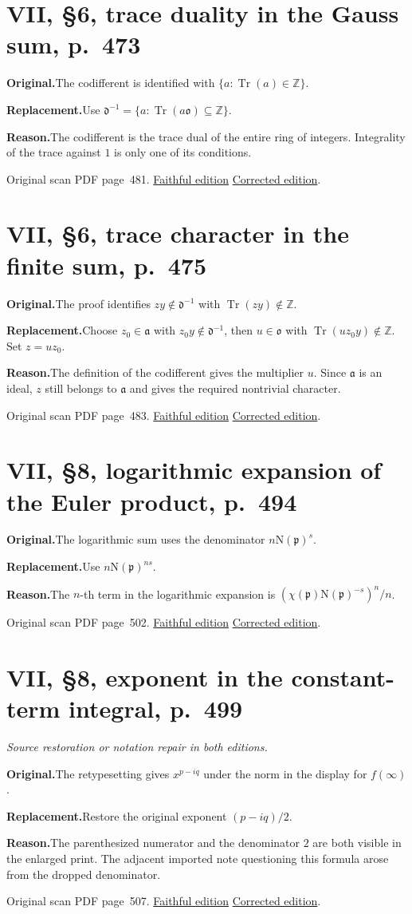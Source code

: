 \documentclass[11pt,a4paper]{article}
\newcommand{\original}{\par\smallskip\noindent\textbf{Original.}\enspace}
\newcommand{\replacement}{\par\smallskip\noindent\textbf{Replacement.}\enspace}
\newcommand{\reason}{\par\smallskip\noindent\textbf{Reason.}\enspace}
\newcommand{\editionlink}[3]{\href{#1\#errata.#2}{#3}}
\newcommand{\location}[2]{%
  \par\smallskip\noindent Original scan PDF page~#2.\enspace
  \editionlink{Neukirch_Faithful.pdf}{#1}{Faithful edition}
  \quad\editionlink{Neukirch_Corrected.pdf}{#1}{Corrected edition}.}
\begin{document}
\setcounter{section}{171}
\section{VII, \S6, trace duality in the Gauss sum, p.~473}\label{errata:item:172}

\original The codifferent is identified with $\{a:\operatorname{Tr}(a)\in\mathbb Z\}$.
\replacement Use $\mathfrak d^{-1}=\{a:\operatorname{Tr}(a\mathfrak o)\subseteq\mathbb Z\}$.
\reason The codifferent is the trace dual of the entire ring of integers. Integrality of the trace against $1$ is only one of its conditions.
\location{172}{481}

\setcounter{section}{172}
\section{VII, \S6, trace character in the finite sum, p.~475}\label{errata:item:173}

\original The proof identifies $zy\notin\mathfrak d^{-1}$ with $\operatorname{Tr}(zy)\notin\mathbb Z$.
\replacement Choose $z_0\in\mathfrak a$ with $z_0y\notin\mathfrak d^{-1}$, then $u\in\mathfrak o$ with $\operatorname{Tr}(uz_0y)\notin\mathbb Z$. Set $z=uz_0$.
\reason The definition of the codifferent gives the multiplier $u$. Since $\mathfrak a$ is an ideal, $z$ still belongs to $\mathfrak a$ and gives the required nontrivial character.
\location{173}{483}

\setcounter{section}{173}
\section{VII, \S8, logarithmic expansion of the Euler product, p.~494}\label{errata:item:174}

\original The logarithmic sum uses the denominator $n\mathrm N(\mathfrak p)^s$.
\replacement Use $n\mathrm N(\mathfrak p)^{ns}$.
\reason The $n$-th term in the logarithmic expansion is $(\chi(\mathfrak p)\mathrm N(\mathfrak p)^{-s})^n/n$.
\location{174}{502}

\setcounter{section}{174}
\section{VII, \S8, exponent in the constant-term integral, p.~499}\label{errata:item:175}
\noindent\emph{Source restoration or notation repair in both editions.}\par
\original The retypesetting gives $x^{p-iq}$ under the norm in the display for $f(\infty)$.
\replacement Restore the original exponent $(p-iq)/2$.
\reason The parenthesized numerator and the denominator $2$ are both visible in the enlarged print. The adjacent imported note questioning this formula arose from the dropped denominator.
\location{175}{507}
\end{document}
